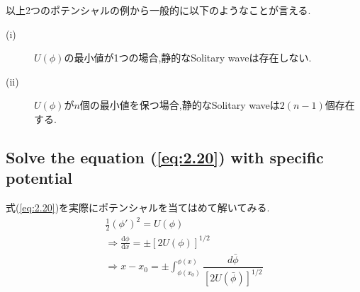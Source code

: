 \documentclass[dvipdfmx,11pt,a4paper,oneside,openany]{jsbook}
\begin{document}
以上2つのポテンシャルの例から一般的に以下のようなことが言える.
\begin{screen}
    \begin{description}
        \item[(i)] $U(\phi)$の最小値が1つの場合,静的なSolitary waveは存在しない.
        \item[(ii)] $U(\phi)$が$n$個の最小値を保つ場合,静的なSolitary waveは$2(n-1)$個存在する.
    \end{description}
\end{screen}

\subsection{Solve the equation (\ref{eq:2.20}) with specific potential}
式(\ref{eq:2.20})を実際にポテンシャルを当てはめて解いてみる.
\begin{align}
    \frac{1}{2}(\phi')^2=U(\phi)\nonumber                                                        \\
    \Rightarrow \frac{\mathrm{d}\phi}{\mathrm{d}x}=\pm\left[2U(\phi)\right]^{1/2}\label{eq:2.22} \\
    \Rightarrow x-x_0=\pm\int_{\phi(x_0)}^{\phi(x)}\dfrac{d\bar{\phi}}{[2U(\bar{\phi})]^{1/2}}\label{eq:2.23}
\end{align}
\end{document}
